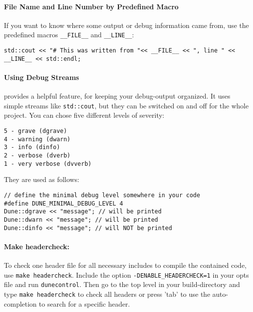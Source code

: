 
\paragraph{File Name and Line Number by Predefined Macro}
If you want to  know where some output or debug information came from, use the predefined
macros \texttt{\_\_FILE\_\_} and \texttt{\_\_LINE\_\_}:
\begin{lstlisting}[style=DumuxCode]
std::cout << "# This was written from "<< __FILE__ << ", line " << __LINE__ << std::endl;
\end{lstlisting}

\paragraph{Using \Dune Debug Streams}
\Dune provides a helpful feature, for keeping your debug-output organized.
It uses simple streams like \texttt{std::cout}, but they can be switched on and off
for the whole project. You can chose five different levels of severity:
\begin{verbatim}
5 - grave (dgrave)
4 - warning (dwarn)
3 - info (dinfo)
2 - verbose (dverb)
1 - very verbose (dvverb)
\end{verbatim}
\noindent They are used as follows:
\begin{lstlisting}[style=DumuxCode]
// define the minimal debug level somewhere in your code
#define DUNE_MINIMAL_DEBUG_LEVEL 4
Dune::dgrave << "message"; // will be printed
Dune::dwarn << "message"; // will be printed
Dune::dinfo << "message"; // will NOT be printed
\end{lstlisting}

\paragraph{Make headercheck:}
To check one header file for all necessary includes to compile the contained code, use \texttt{make headercheck}.
Include the option \texttt{-DENABLE\_HEADERCHECK=1} in your opts file and run \texttt{dunecontrol}.
Then go to the top level in your build-directory and type \texttt{make headercheck} to check all headers
or press 'tab' to use the auto-completion to search for a specific header.
